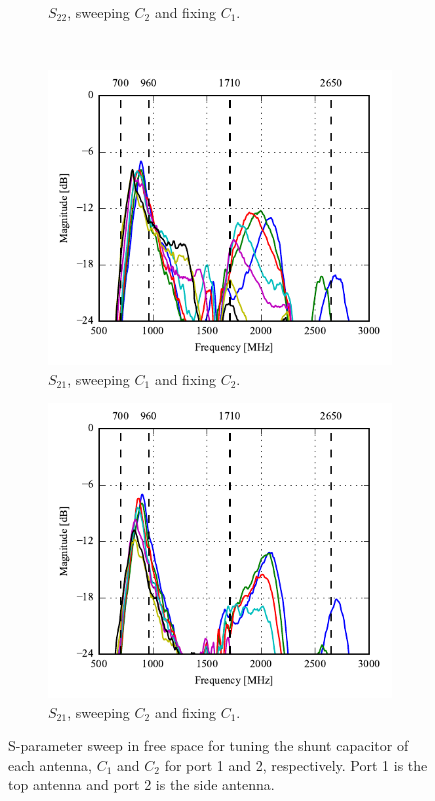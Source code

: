 \begin{figure}[htbp]
\begin{subfigure}[b]{0.49\linewidth}
        \caption{$S_{22}$, sweeping $C_2$ and fixing $C_1$.}
        \label{fig:ant1_proto_meas_s22}
    \end{subfigure}
~
    \begin{subfigure}[b]{0.49\linewidth}
        \centering
        \includegraphics{img/tech_sol/monopole/prototype_v2/meas_s12_csh1}
        \caption{$S_{21}$, sweeping $C_1$ and fixing $C_2$.}
        \label{fig:ant1_proto_meas_s12}
    \end{subfigure}
    \hfill
    \begin{subfigure}[b]{0.49\linewidth}
        \centering
        \includegraphics{img/tech_sol/monopole/prototype_v2/meas_s21_csh1}
        \caption{$S_{21}$, sweeping $C_2$ and fixing $C_1$.}
        \label{fig:ant1_proto_meas_s21}
    \end{subfigure}
    \caption{S-parameter sweep in free space for tuning the shunt capacitor of each antenna, $C_1$ and $C_2$ for port 1 and 2, respectively. Port 1 is the top antenna and port 2 is the side antenna.}
    \label{fig:sparam_mono_proto_sim}
\end{figure}

